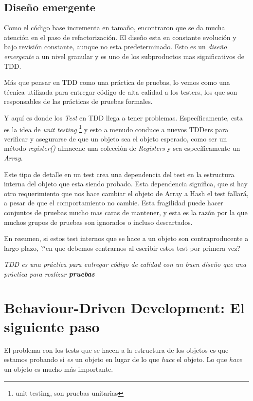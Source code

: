 \subsection{Diseño emergente}

Como el código base incrementa en tamaño, encontraron que se da mucha atención
en el paso de refactorización. El diseño esta en constante evolución y bajo
revisión constante, aunque no esta predeterminado. Esto es un {\it diseño
emergente} a un nivel granular y es uno de los subproductos mas significativos
de TDD.

Más que pensar en TDD como una práctica de pruebas, lo vemos como una técnica
utilizada para entregar código de alta calidad a los testers, los que son
responsables de las prácticas de pruebas formales.

Y aquí es donde los {\it Test} en TDD llega a tener problemas. Específicamente,
esta es la idea de {\it unit testing }\footnote{unit testing, son pruebas unitarias}
y esto a menudo conduce a nuevos TDDers para verificar y asegurarse de que un objeto
sea el objeto esperado, como ser un método {\it register()} almacene una colección
de {\it Registers} y sea específicamente un {\it Array}.

Este tipo de detalle en un test crea una dependencia del test en la estructura
interna del objeto que esta siendo probado. Esta dependencia significa, que si
hay otro requerimiento que nos hace cambiar el objeto de Array a Hash el test
fallará, a pesar de que el comportamiento no cambie. Esta fragilidad puede hacer
conjuntos de pruebas mucho mas caras de mantener, y esta es la razón por la que
muchos grupos de pruebas son ignorados o incluso descartados.

En resumen, si estos test internos que se hace a un objeto son contraproducente
a largo plazo, ?`en que debemos centrarnos al escribir estos test por primera vez?

\vspace{0.5cm}
\begin{mdframed}
{\it TDD es una práctica para entregar código de calidad con un buen diseño
  que una práctica para realizar {\bfseries pruebas}}
\end{mdframed}

\section{Behaviour-Driven Development: El siguiente paso}
El problema con los tests que se hacen a la estructura de los objetos es que
estamos probando si {\it es} un objeto en lugar de lo que {\it hace} el objeto. Lo que
{\it hace} un objeto es mucho más importante.

